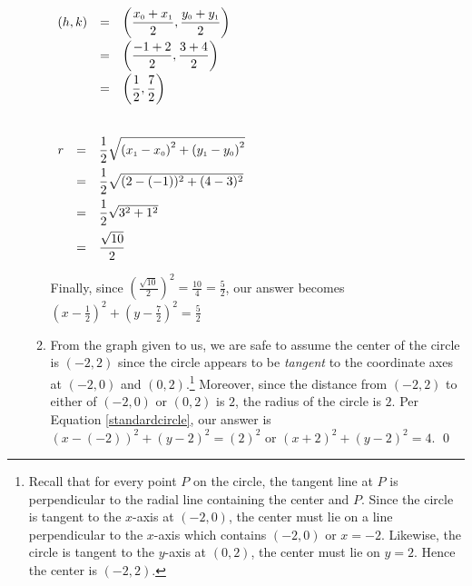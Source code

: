 \documentclass{ximera}
\begin{document}
\begin{example}
\begin{enumerate}
\begin{enumerate}
\begin{multicols}{2}

$\begin{array}{rcl} (h,k) &  = & \left( \dfrac{x_{\text{\tiny$0$}} + x_{\text{\tiny$1$}}}{2},  \dfrac{y_{\text{\tiny$0$}} + y_{\text{\tiny$1$}}}{2} \right) \\ [8pt]
&  = &  \left( \dfrac{-1+2}{2},  \dfrac{3+4}{2} \right) \\ [8pt]
& = &  \left( \dfrac{1}{2},  \dfrac{7}{2} \right)   \\  [8pt]
&& \\ \end{array}$

$\begin{array}{rcl} r &  = & \dfrac{1}{2} \sqrt{\left(x_{\text{\tiny$1$}} - x_{\text{\tiny$0$}}\right)^2+\left(y_{\text{\tiny$1$}}-y_{\text{\tiny$0$}}\right)^2}  \\ [8pt]
 &  = & \dfrac{1}{2} \sqrt{(2-(-1))^2+(4-3)^2} \\ [8pt]
 & = & \dfrac{1}{2} \sqrt{3^2+1^2} \\ [8pt]
 & = &\dfrac{\sqrt{10}}{2} \end{array} $
 
 \end{multicols}
 
 
Finally, since $\left( \frac{\sqrt{10}}{2} \right)^2 = \frac{10}{4} = \frac{5}{2}$, our answer becomes $\left(x - \frac{1}{2} \right)^2 + \left(y - \frac{7}{2} \right)^2 =\frac{5}{2}$

\item  From the graph given to us, we are safe to assume the center of the circle is $(-2,2)$ since the circle appears to be \textit{tangent} to the coordinate axes at $(-2,0)$ and $(0,2)$.\footnote{Recall that for every point $P$ on the circle, the tangent line at $P$ is perpendicular to the radial line containing the center and $P$. Since the circle is tangent to the $x$-axis at $(-2,0)$, the center must lie on a line perpendicular to the $x$-axis which contains $(-2,0)$ or $x = -2$.  Likewise,  the circle is tangent to the $y$-axis at $(0,2)$,  the center must lie on $y=2$.  Hence the center is $(-2,2)$.}   Moreover, since the distance from $(-2,2)$ to either of $(-2,0)$ or $(0,2)$ is $2$, the radius of the circle is $2$.  Per Equation \ref{standardcircle}, our answer is $(x-(-2))^2 + (y-2)^2 = (2)^2$ or $(x+2)^2+(y-2)^2 = 4$. \qed

\end{enumerate}

\end{enumerate}

\end{example}
\end{document}
